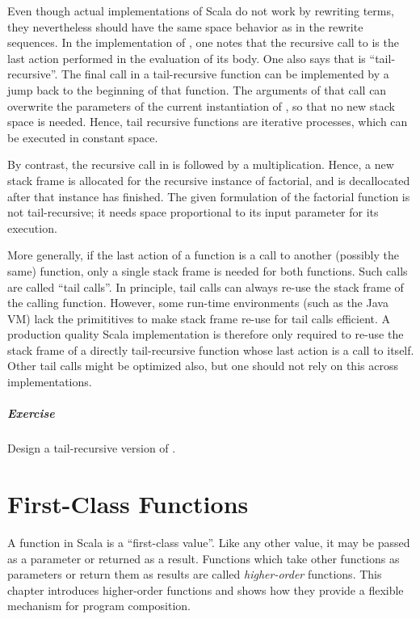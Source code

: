 \documentclass[a4paper,12pt,twoside,titlepage]{book}
\newcommand{\exercise}{\paragraph{Exercise}}
\begin{document}
Even though actual implementations of Scala do not work by rewriting
terms, they nevertheless should have the same space behavior as in the
rewrite sequences. In the implementation of , one notes that
the recursive call to  is the last action performed in the
evaluation of its body. One also says that  is
``tail-recursive''. The final call in a tail-recursive function can be
implemented by a jump back to the beginning of that function. The
arguments of that call can overwrite the parameters of the current
instantiation of , so that no new stack space is needed.
Hence, tail recursive functions are iterative processes, which can be
executed in constant space.

By contrast, the recursive call in  is followed by a
multiplication.  Hence, a new stack frame is allocated for the
recursive instance of factorial, and is decallocated after that
instance has finished. The given formulation of the factorial function
is not tail-recursive; it needs space proportional to its input
parameter for its execution.

More generally, if the last action of a function is a call to another
(possibly the same) function, only a single stack frame is needed for
both functions. Such calls are called ``tail calls''. In principle,
tail calls can always re-use the stack frame of the calling function.
However, some run-time environments (such as the Java VM) lack the
primititives to make stack frame re-use for tail calls efficient.  A
production quality Scala implementation is therefore only required to
re-use the stack frame of a directly tail-recursive function whose
last action is a call to itself.  Other tail calls might be optimized
also, but one should not rely on this across implementations.

\exercise Design a tail-recursive version of
.

\chapter{\label{chap:first-class-funs}First-Class Functions}

A function in Scala is a ``first-class value''. Like any other value,
it may be passed as a parameter or returned as a result.  Functions
which take other functions as parameters or return them as results are
called {\em higher-order} functions. This chapter introduces
higher-order functions and shows how they provide a flexible mechanism
for program composition.
\end{document}
